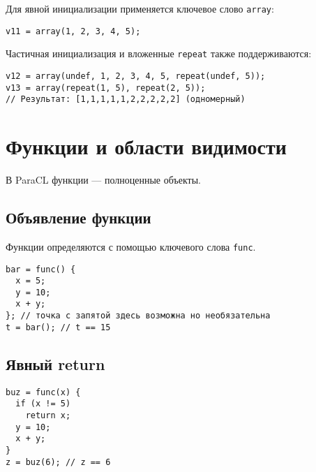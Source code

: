 \documentclass[a4paper,12pt]{article}
\begin{document}
Для явной инициализации применяется ключевое слово \texttt{array}:

\begin{tcolorbox}[colback=bg, colframe=frame, title=Пример инициализации]
\begin{verbatim}
v11 = array(1, 2, 3, 4, 5);
\end{verbatim}
\end{tcolorbox}

Частичная инициализация и вложенные \texttt{repeat} также поддерживаются:

\begin{tcolorbox}[colback=bg, colframe=frame, title=Частичная инициализация с flatten]
\begin{verbatim}
v12 = array(undef, 1, 2, 3, 4, 5, repeat(undef, 5));
v13 = array(repeat(1, 5), repeat(2, 5));
// Результат: [1,1,1,1,1,2,2,2,2,2] (одномерный)
\end{verbatim}
\end{tcolorbox}

\section{Функции и области видимости}

В ParaCL функции — полноценные объекты.

\subsection{Объявление функции}
Функции определяются с помощью ключевого слова \texttt{func}. 

\begin{tcolorbox}[colback=bg, colframe=frame, title=Возврат последнего выражения]
\begin{verbatim}
bar = func() {
  x = 5;
  y = 10;
  x + y;
}; // точка с запятой здесь возможна но необязательна
t = bar(); // t == 15
\end{verbatim}
\end{tcolorbox}

\subsection{Явный return}

\begin{tcolorbox}[colback=bg, colframe=frame, title=Возвращаемое значение с return]
\begin{verbatim}
buz = func(x) {
  if (x != 5)
    return x;
  y = 10;
  x + y;
}
z = buz(6); // z == 6
\end{verbatim}
\end{tcolorbox}
\end{document}
